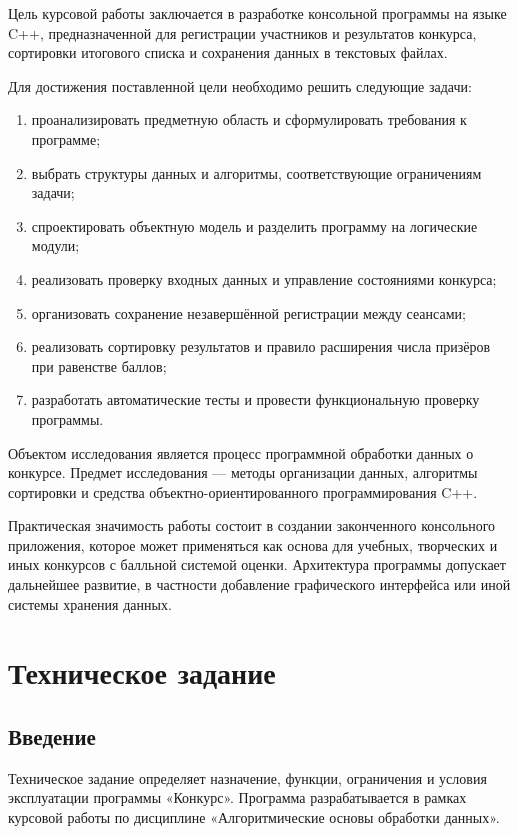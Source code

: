\documentclass[14pt,a4paper]{extarticle}
\begin{document}
Цель курсовой работы заключается в разработке консольной программы на языке C++, предназначенной для регистрации участников и результатов конкурса, сортировки итогового списка и сохранения данных в текстовых файлах.

Для достижения поставленной цели необходимо решить следующие задачи:
\begin{enumerate}
\item проанализировать предметную область и сформулировать требования к программе;
\item выбрать структуры данных и алгоритмы, соответствующие ограничениям задачи;
\item спроектировать объектную модель и разделить программу на логические модули;
\item реализовать проверку входных данных и управление состояниями конкурса;
\item организовать сохранение незавершённой регистрации между сеансами;
\item реализовать сортировку результатов и правило расширения числа призёров при равенстве баллов;
\item разработать автоматические тесты и провести функциональную проверку программы.
\end{enumerate}

Объектом исследования является процесс программной обработки данных о конкурсе. Предмет исследования --- методы организации данных, алгоритмы сортировки и средства объектно-ориентированного программирования C++.

Практическая значимость работы состоит в создании законченного консольного приложения, которое может применяться как основа для учебных, творческих и иных конкурсов с балльной системой оценки. Архитектура программы допускает дальнейшее развитие, в частности добавление графического интерфейса или иной системы хранения данных.

\clearpage
\section{Техническое задание}

\subsection{Введение}

Техническое задание определяет назначение, функции, ограничения и условия эксплуатации программы «Конкурс». Программа разрабатывается в рамках курсовой работы по дисциплине «Алгоритмические основы обработки данных».
\end{document}
